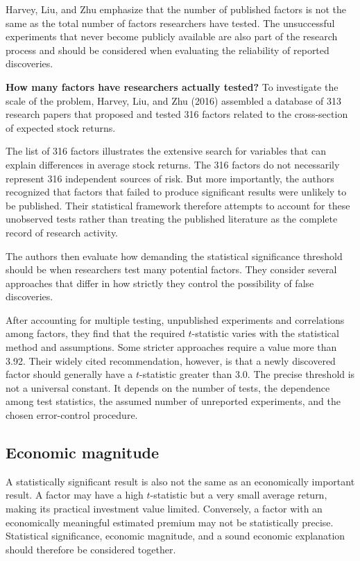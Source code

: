 Harvey, Liu, and Zhu emphasize that the number of published
factors is not the same as the total number of factors researchers
have tested. The unsuccessful experiments that never become
publicly available are also part of the research process and
should be considered when evaluating the reliability of reported
discoveries.

\textbf{How many factors have researchers actually tested?}
To investigate the scale of the problem, Harvey, Liu, and Zhu
(2016) assembled a database of 313 research papers that proposed
and tested 316 factors related to the cross-section of expected
stock returns. 

The list of 316 factors illustrates the extensive search for
variables that can explain differences in average stock returns.
The 316 factors do
not necessarily represent 316 independent sources of risk.
But more importantly, the authors recognized that factors that failed to
produce significant results were unlikely to be published.
Their statistical framework therefore attempts to account for
these unobserved tests rather than treating the published
literature as the complete record of research activity.

The authors then evaluate how demanding the statistical
significance threshold should be when researchers test many
potential factors. They consider several approaches that
differ in how strictly they control the possibility of false
discoveries. 


After accounting for multiple testing, unpublished
experiments and correlations among factors, they find
that the required $t$-statistic varies with the statistical
method and assumptions. Some stricter approaches require
a value more than 3.92. Their widely cited recommendation,
however, is that a newly discovered factor should generally
have a $t$-statistic greater than 3.0.
The precise threshold is not a universal constant. It depends
on the number of tests, the dependence among test statistics,
the assumed number of unreported experiments, and the chosen
error-control procedure. 

\subsection{Economic magnitude}
A statistically significant result is also not the same
as an economically important result. A factor may have a
high $t$-statistic but a very small average return, making
its practical investment value limited. Conversely, a
factor with an economically meaningful estimated premium
may not be statistically precise. Statistical significance,
economic magnitude, and a sound economic explanation
should therefore be considered together.

